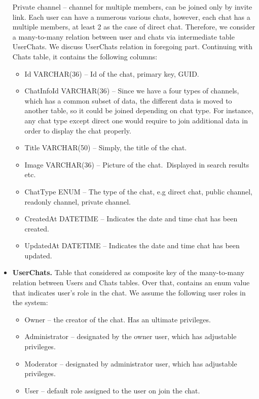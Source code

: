 \begin{itemize}
    Private channel -- channel for multiple members, can be joined only by invite link.
    Each user can have a numerous various chats, however, each chat has a multiple members, at least 2 as the case of direct chat.
    Therefore, we consider a many-to-many relation between user and chats via intermediate table UserChats.
    We discuss UserChats relation in foregoing part.
    Continuing with Chats table, it contains the following columns:
    \begin{itemize}
        \item Id VARCHAR(36) -- Id of the chat, primary key, GUID.
        \item ChatInfoId VARCHAR(36) -- Since we have a four types of channels, which has a common subset of data,
        the different data is moved to another table, so it could be joined depending on chat type.
        For instance, any chat type except direct one would require to join additional data in order to display the chat properly.
        \item Title VARCHAR(50) -- Simply, the title of the chat.
        \item Image VARCHAR(36) -- Picture of the chat.\ Displayed in search results etc.
        \item ChatType ENUM -- The type of the chat, e.g direct chat, public channel, readonly channel, private channel.
        \item CreatedAt DATETIME -- Indicates the date and time chat has been created.
        \item UpdatedAt DATETIME -- Indicates the date and time chat has been updated.
    \end{itemize}
    \item \textbf{UserChats.} Table that considered as composite key of the many-to-many relation between Users and Chats tables.
    Over that, contains an enum value that indicates user's role in the chat.
    We assume the following user roles in the system:
    \begin{itemize}
        \item Owner -- the creator of the chat.
        Has an ultimate privileges.
        \item Administrator -- designated by the owner user, which has adjustable privileges.
        \item Moderator -- designated by administrator user, which has adjustable privileges.
        \item User -- default role assigned to the user on join the chat.
    \end{itemize}

\end{itemize}
